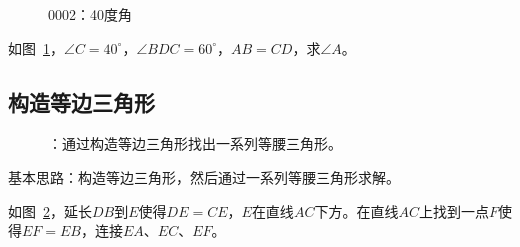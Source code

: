 

\begin{figure}[htbp]
  \centering
  \caption{0002：40度角} \label{fig:0002}
\end{figure}

如图~\ref{fig:0002}，$\angle C = 40^\circ$，$\angle BDC = 60^\circ$，$AB = CD$，求$\angle A$。


\subsection{构造等边三角形} \label{subsec:0002-eqtri}

\begin{figure}[htbp]
  \centering
  \caption{：通过构造等边三角形找出一系列等腰三角形。} \label{fig:0002-eqtri}
\end{figure}

基本思路：构造等边三角形，然后通过一系列等腰三角形求解。

如图~\ref{fig:0002-eqtri}，延长$DB$到$E$使得$DE = CE$，$E$在直线$AC$下方。在直线$AC$上找到一点$F$使得$EF = EB$，连接$EA$、$EC$、$EF$。

